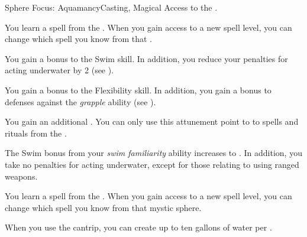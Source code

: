     \begin{feat}{Sphere Focus: Aquamancy}{Casting, Magical}
        \featpre Access to the  .

         You learn a spell from the  .
        When you gain access to a new spell level, you can change which spell you know from that .

         You gain a  bonus to the Swim skill.
        In addition, you reduce your penalties for acting underwater by 2 (see ).

         You gain a  bonus to the Flexibility skill.
        In addition, you gain a  bonus to defenses against the \textit{grapple} ability (see ).

         You gain an additional .
        You can only use this attunement point to  to spells and rituals from the  .

         The Swim bonus from your \textit{swim familiarity} ability increases to .
        In addition, you take no penalties for acting underwater, except for those relating to using ranged weapons.

         You learn a spell from the  .
        When you gain access to a new spell level, you can change which spell you know from that mystic sphere.

         When you use the  cantrip, you can create up to ten gallons of water per .
    \end{feat}

